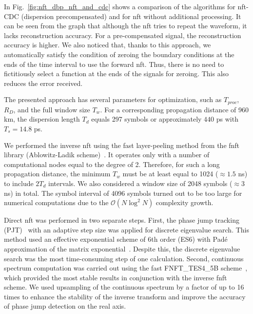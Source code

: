 In Fig.~\ref{fig:nft_dbp_nft_and_cdc} shows a comparison of the algorithms for \acrshort{nft}-CDC (dispersion precompensated) and for \acrshort{nft} without additional processing.
It can be seen from the graph that although the \acrshort{nft} tries to repeat the waveform, it lacks reconstruction accuracy. For a pre-compensated signal, the reconstruction accuracy is higher. We also noticed that, thanks to this approach, we automatically satisfy the condition of zeroing the boundary conditions at the ends of the time interval to use the forward \acrshort{nft}. Thus, there is no need to fictitiously select a function at the ends of the signals for zeroing. This also reduces the error received.



The presented approach has several parameters for optimization, such as $T_{proc}$, $R_D$, and the full window size $T_{w}$. For a corresponding propagation distance of 960 km, the dispersion length $T_d$ equals 297 symbols or approximately $440$ ps with $T_s=14.8$ ps.

We performed the inverse \acrshort{nft} using the fast layer-peeling method from the \acrshort{fnft} library (Ablowitz-Ladik scheme)~\cite{Wahls2016}. It operates only with a number of computational nodes equal to the degree of 2. Therefore, for such a long propagation distance, the minimum $T_w$ must be at least equal to 1024 ($\approx 1.5$ ns) to include $2 T_d$ intervals. We also considered a window size of 2048 symbols ($\approx 3$ ns) in total. The symbol interval of 4096 symbols turned out to be too large for numerical computations due to the $\mathcal{O}(N \log^2 N)$ complexity growth.

Direct \acrshort{nft} was performed in two separate steps. First, the phase jump tracking (PJT)~\cite{chekhovskoy2020introducing, 9542265} with an adaptive step size was applied for discrete eigenvalue search. This method used an effective exponential scheme of 6th order (ES6) with Pad\'e approximation of the matrix exponential~\cite{Medvedev2022}. Despite this, the discrete eigenvalue search was the most time-consuming step of one calculation.
%
Second, continuous spectrum computation was carried out using the fast FNFT\_TES4\_5B scheme~\cite{Medvedev2020_OE, Prins2018a}, which provided the most stable results in conjunction with the inverse \acrshort{fnft} scheme.
%
We used upsampling of the continuous spectrum by a factor of up to 16 times to enhance the stability of the inverse transform and improve the accuracy of phase jump detection on the real axis.

